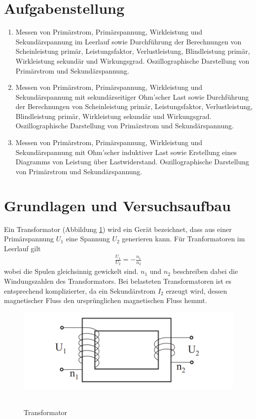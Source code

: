 \documentclass{article}
\begin{document}
\parindent0cm




\pagestyle{fancy}

\section{Aufgabenstellung}

\begin{enumerate}
\item Messen von Primärstrom, Primärspannung, Wirkleistung und Sekundärspannung im Leerlauf sowie Durchführung der Berechnungen von Scheinleistung primär, Leistungsfaktor, Verlustleistung, Blindleistung primär, Wirkleistung sekundär und Wirkungsgrad. Oszillographische Darstellung von Primärstrom und Sekundärspannung.
\item Messen von Primärstrom, Primärspannung, Wirkleistung und Sekundärspannung mit sekundärseitiger Ohm’scher Last sowie Durchführung der Berechnungen von Scheinleistung primär, Leistungsfaktor, Verlustleistung, Blindleistung primär, Wirkleistung sekundär und Wirkungsgrad. Oszillographische Darstellung von Primärstrom und Sekundärspannung.
\item Messen von Primärstrom, Primärspannung, Wirkleistung und Sekundärspannung mit Ohm'scher induktiver Last sowie Erstellung eines Diagramms von Leistung über Lastwiderstand. Oszillographische Darstellung von Primärstrom und Sekundärspannung.
\end{enumerate}



\section{Grundlagen und Versuchsaufbau}

Ein Transformator (Abbildung \ref{fig:transformator}) wird  ein Gerät bezeichnet, dass aus einer Primärspannung $U_1$ eine Spannung $U_2$ generieren kann. Für Tranformatoren im Leerlauf gilt
\begin{align}
\frac{U_1}{U_2} = -\frac{n_1}{n_2}
\end{align}
wobei die Spulen gleichsinnig gewickelt sind. $n_1$ und $n_2$ beschreiben dabei die Windungszahlen des Transformators. Bei belasteten Transformatoren ist es entsprechend komplizierter, da ein Sekundärstrom $I_2$ erzeugt wird, dessen magnetischer Fluss den ursprünglichen magnetischen Fluss hemmt. 

\begin{figure}[H]
\caption{Transformator}
\label{fig:transformator}
{\centering
\includegraphics[scale=0.4]{transformator.png}
~
}
\end{figure}
\end{document}
